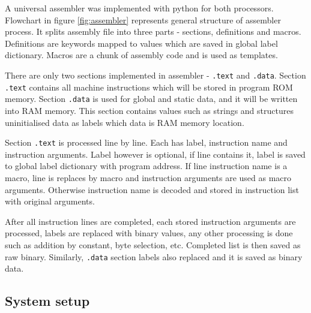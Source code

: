 A universal assembler was implemented with python for both processors. Flowchart in figure \ref{fig:assembler} represents general structure of assembler process. It splits assembly file into three parts - sections, definitions and macros. Definitions are keywords mapped to values which are saved in global label dictionary. Macros are a chunk of assembly code and is used as templates. 

There are only two sections implemented in assembler - \texttt{.text} and \texttt{.data}. Section \texttt{.text} contains all machine instructions which will be stored in program ROM memory. Section \texttt{.data} is used for global and static data, and it will be written into RAM memory. This section contains values such as strings and structures uninitialised data as labels which data is RAM memory location. 

Section \texttt{.text} is processed line by line. Each has label, instruction name and instruction arguments. Label however is optional, if line contains it, label is saved to global label dictionary with program address. If line instruction name is a macro, line is replaces by macro and instruction arguments are used as macro arguments. Otherwise instruction name is decoded and stored in instruction list with original arguments.

After all instruction lines are completed, each stored instruction arguments are processed, labels are replaced with binary values, any other processing is done such as addition by constant, byte selection, etc. Completed list is then saved as raw binary. Similarly, \texttt{.data} section labels also replaced and it is saved as binary data.

\subsection{System setup}\label{subsec:setup}




